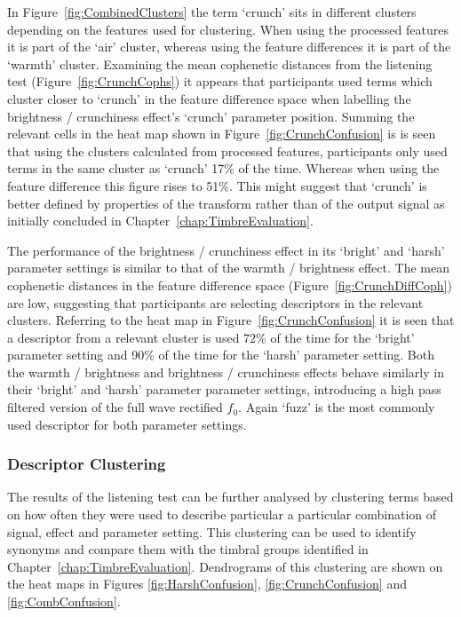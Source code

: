 			In Figure~\ref{fig:CombinedClusters} the term `crunch' sits in different clusters depending on the
			features used for clustering. When using the processed features it is part of the `air' cluster,
			whereas using the feature differences it is part of the `warmth' cluster. Examining the mean
			cophenetic distances from the listening test (Figure~\ref{fig:CrunchCophs}) it appears that
			participants used terms which cluster closer to `crunch' in the feature difference space when
			labelling the brightness / crunchiness effect's `crunch' parameter position. Summing the relevant
			cells in the heat map shown in Figure~\ref{fig:CrunchConfusion} is is seen that using the clusters
			calculated from processed features, participants only used terms in the same cluster as `crunch'
			17\% of the time. Whereas when using the feature difference this figure rises to 51\%. This might
			suggest that `crunch' is better defined by properties of the transform rather than of the output
			signal as initially concluded in Chapter~\ref{chap:TimbreEvaluation}.

			The performance of the brightness / crunchiness effect in its `bright' and `harsh' parameter
			settings is similar to that of the warmth / brightness effect. The mean cophenetic distances in the
			feature difference space (Figure~\ref{fig:CrunchDiffCoph}) are low, suggesting that participants
			are selecting descriptors in the relevant clusters. Referring to the heat map in
			Figure~\ref{fig:CrunchConfusion} it is seen that a descriptor from a relevant cluster is used 72\%
			of the time for the `bright' parameter setting and 90\% of the time for the `harsh' parameter
			setting.  Both the warmth / brightness and brightness / crunchiness effects behave similarly in
			their `bright' and `harsh' parameter parameter settings, introducing a high pass filtered version
			of the full wave rectified $f_{0}$. Again `fuzz' is the most commonly used descriptor for both
			parameter settings.

		\subsubsection*{Descriptor Clustering}
			The results of the listening test can be further analysed by clustering terms based on how often
			they were used to describe particular a particular combination of signal, effect and parameter
			setting. This clustering can be used to identify synonyms and compare them with the timbral groups
			identified in Chapter~\ref{chap:TimbreEvaluation}. Dendrograms of this clustering are shown on the
			heat maps in Figures \ref{fig:HarshConfusion}, \ref{fig:CrunchConfusion} and
			\ref{fig:CombConfusion}.

